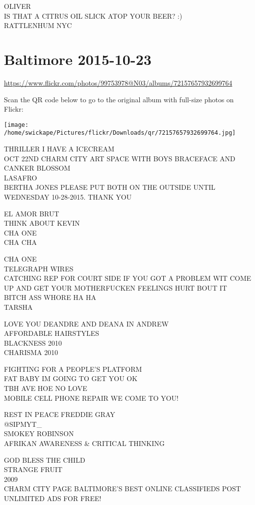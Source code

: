 \documentclass[10pt,letterpaper]{article}
\begin{document}
OLIVER\\
IS THAT A CITRUS OIL SLICK ATOP YOUR BEER? :)\\
RATTLENHUM NYC


\section*{Baltimore 2015-10-23}

\url{https://www.flickr.com/photos/99753978@N03/albums/72157657932699764}

Scan the QR code below to go to the original album with full-size photos on Flickr:

\texttt{[image: /home/swickape/Pictures/flickr/Downloads/qr/72157657932699764.jpg]}


THRILLER I HAVE A ICECREAM\\
OCT 22ND CHARM CITY ART SPACE WITH BOYS BRACEFACE AND CANKER BLOSSOM\\
LASAFRO\\
BERTHA JONES PLEASE PUT BOTH ON THE OUTSIDE UNTIL WEDNESDAY 10{-}28{-}2015.  THANK YOU

EL AMOR BRUT\\
THINK ABOUT KEVIN\\
CHA ONE\\
CHA CHA

CHA ONE\\
TELEGRAPH WIRES\\
CATCHING REP FOR COURT SIDE IF YOU GOT A PROBLEM WIT COME UP AND GET YOUR MOTHERFUCKEN FEELINGS HURT BOUT IT BITCH ASS WHORE HA HA\\
TARSHA

LOVE YOU DEANDRE AND DEANA IN ANDREW\\
AFFORDABLE HAIRSTYLES\\
BLACKNESS 2010\\
CHARISMA 2010

FIGHTING FOR A PEOPLE'S PLATFORM\\
FAT BABY IM GOING TO GET YOU OK\\
TBH AVE HOE NO LOVE\\
MOBILE CELL PHONE REPAIR WE COME TO YOU!

REST IN PEACE FREDDIE GRAY\\
@SIPMYT\_\\
SMOKEY ROBINSON\\
AFRIKAN AWARENESS \& CRITICAL THINKING

GOD BLESS THE CHILD\\
STRANGE FRUIT\\
2009\\
CHARM CITY PAGE BALTIMORE'S BEST ONLINE CLASSIFIEDS POST UNLIMITED ADS FOR FREE!
\end{document}
